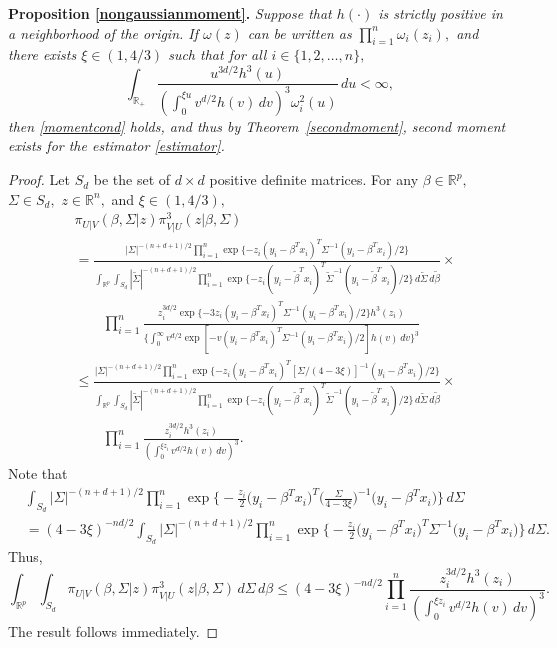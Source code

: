 \documentclass[11pt]{article}
\begin{document}
	\vspace*{3mm}
	\noindent
	{\bf Proposition \ref{nongaussianmoment}.\;} \textit{ Suppose that
		$h(\cdot)$ is strictly positive in a neighborhood of the
		origin.  If $\omega(z)$ can be written as $\prod_{i=1}^{n}
		\omega_i(z_i),$ and there exists $\xi \in (1,4/3)$ such that
		for all $i \in \{1,2,\dots,n\},$
		\begin{equation*}
                  \int_{\mathbb{R}_+} \frac{u^{3d/2}h^3(u)} {(\int_{0}^{\xi u} v^{d/2}h(v) \, dv)^3 \omega_i^2(u) } \, du < \infty,
		\end{equation*}
		then \eqref{momentcond} holds, and thus by
                Theorem~\ref{secondmoment}, second moment exists for
                the estimator \eqref{estimator}.  }
	
	\begin{proof}
		Let $S_d$ be the set of $d \times d$ positive definite matrices. For any $\beta \in \mathbb{R}^p,$ $\Sigma \in S_d,$ $z\in \mathbb{R}^n,$ and $\xi \in (1,4/3),$
		\[
		\begin{aligned}
		&\pi_{U|V}(\beta,\Sigma|z) \pi^3_{V|U}(z|\beta,\Sigma) \\
		&= \frac{ |\Sigma|^{-(n+d+1)/2} \prod_{i=1}^{n}\exp \{ -z_i (y_i-\beta^Tx_i )^T \Sigma^{-1} (y_i-\beta^Tx_i ) / 2 \} } { \int_{\mathbb{R}^p} \int_{S_d} |\tilde{\Sigma}|^{-(n+d+1)/2} \prod_{i=1}^{n}\exp \{ -z_i (y_i-\tilde{\beta}^Tx_i )^T \tilde{\Sigma}^{-1} (y_i-\tilde{\beta}^Tx_i ) / 2 \} \, d\tilde{\Sigma}\,d\tilde{\beta}  } \times \\
		&\quad\quad \prod_{i=1}^{n} \frac{ z_i^{3d/2} \exp \{ -3z_i (y_i-\beta^Tx_i )^T \Sigma^{-1} (y_i-\beta^Tx_i )/2 \} h^3(z_i) } { \{ \int_0^{\infty} v^{d/2} \exp [ -v (y_i-\beta^Tx_i )^T \Sigma^{-1} (y_i-\beta^Tx_i ) / 2 ] h(v) \, dv \}^3 } \\
		& \leq \frac{ |\Sigma|^{-(n+d+1)/2} \prod_{i=1}^{n}\exp \{ -z_i (y_i-\beta^Tx_i )^T [\Sigma/(4-3\xi)]^{-1} (y_i-\beta^Tx_i ) /2 \} } { \int_{\mathbb{R}^p} \int_{S_d} |\tilde{\Sigma}|^{-(n+d+1)/2} \prod_{i=1}^{n}\exp \{ -z_i (y_i-\tilde{\beta}^Tx_i )^T \tilde{\Sigma}^{-1} (y_i-\tilde{\beta}^Tx_i ) / 2 \} \, d\tilde{\Sigma}\,d\tilde{\beta}  } \times \\
		&\quad\quad \prod_{i=1}^{n} \frac{ z_i^{3d/2} h^3(z_i) } { ( \int_0^{\xi z_i} v^{d/2} h(v) \, dv )^3 }.
		\end{aligned}
		\]
		Note that
		\[
		\begin{aligned}
		&\int_{S_d} |\Sigma|^{-(n+d+1)/2} \prod_{i=1}^{n}\exp \bigg\{ -\frac{z_i}{2} \big(y_i-\beta^Tx_i \big)^T \bigg(\frac{\Sigma}{4-3\xi}\bigg)^{-1} \big(y_i-\beta^Tx_i \big) \bigg\} \, d\Sigma \\
		&= (4-3\xi)^{-nd/2} \int_{S_d} |\Sigma|^{-(n+d+1)/2} \prod_{i=1}^{n}\exp \Big\{ -\frac{z_i}{2} \big(y_i-\beta^Tx_i \big)^T \Sigma^{-1} \big(y_i-\beta^Tx_i \big) \Big\} \, d\Sigma.
		\end{aligned}
		\]
		Thus,
		\[
		\int_{\mathbb{R}^p} \int_{S_d} \pi_{U|V}(\beta,\Sigma|z) \pi^3_{V|U}(z|\beta,\Sigma) \, d\Sigma \, d\beta \leq (4-3\xi)^{-nd/2}  \prod_{i=1}^{n} \frac{ z_i^{3d/2} h^3(z_i) } { ( \int_0^{\xi z_i} v^{d/2} h(v) \, dv )^3 }.
		\]
		The result follows immediately.
	\end{proof}
	
	
	
	
\end{document}
